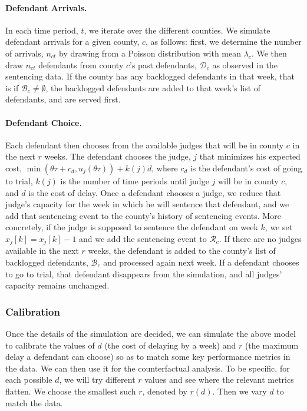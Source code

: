 \documentclass[11pt, oneside]{article}   	%
\theoremstyle{ModifiedStyle}
\begin{document}
			\paragraph{Defendant Arrivals.} In each time period, $t$, we iterate over the different counties. We simulate defendant arrivals for a given county, $c$, as follows: first, we determine the number of arrivals, $n_{ct}$ by drawing from a Poisson distribution with mean $\lambda_c$. We then draw $n_{ct}$ defendants from county $c$'s past defendants, $\mathcal{D}_c$ as observed in the sentencing data. If the county has any backlogged defendants in that week, that is if $\mathcal{B}_c \neq \emptyset$, the backlogged defendants are added to that week's list of defendants, and are served first.

			\paragraph{Defendant Choice.} Each defendant then chooses from the available judges that will be in
			county $c$ in the next $r$ weeks. The defendant chooses the judge, $j$ that minimizes his expected cost, $\min(\theta \tau + c_d,u_j(\theta \tau)) + k(j)d$, where $c_d$ is the defendant's cost of going to trial, $k(j)$ is the number of time periods until judge $j$ will be in county $c$, and $d$ is the cost of delay. Once a defendant chooses a judge, we reduce that judge's capacity for the week in which he will sentence that defendant, and we add that sentencing event to the county's history of sentencing events. More concretely, if the judge is supposed to sentence the defendant on week $k$, we set $x_j[k] = x_j[k]-1$ and we add the sentencing event to $\mathcal{R}_c$. If there are no judges available in the next $r$ weeks, the defendant is added to the county's list of backlogged defendants, $\mathcal{B}_c$ and processed again next week. If a defendant chooses to go to trial, that defendant disappears from the simulation, and all judges' capacity remains unchanged.

		\subsubsection{Calibration}
			Once the details of the simulation are decided, we can simulate the above model to calibrate the values of $d$ (the cost of delaying by a week) and $r$ (the maximum delay a defendant can choose) so as to match some key performance metrics in the data. We can then use it for the counterfactual analysis. To be specific, for each possible $d$, we will try different $r$ values and see where the relevant metrics flatten. We choose the smallest such $r$, denoted by $r(d)$. Then we vary $d$ to match the data.
\end{document}
